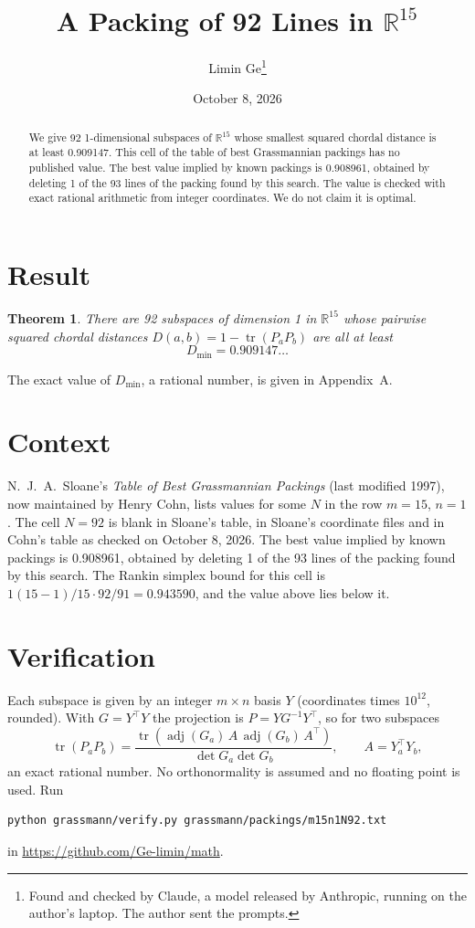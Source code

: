 \documentclass[11pt,a4paper]{article}
\title{A Packing of 92 Lines in $\mathbb{R}^{15}$}
\author{Limin Ge\thanks{Found and checked by Claude, a model released by Anthropic, running on the author's laptop. The author sent the prompts.}}
\date{October 8, 2026}
\newtheorem*{theorem}{Theorem}
\begin{document}
\maketitle
\begin{abstract}
We give 92 1-dimensional subspaces of $\mathbb{R}^{15}$ whose smallest squared chordal distance is at least 0.909147. This cell of the table of best Grassmannian packings has no published value. The best value implied by known packings is 0.908961, obtained by deleting 1 of the 93 lines of the packing found by this search. The value is checked with exact rational arithmetic from integer coordinates. We do not claim it is optimal.
\end{abstract}

\section{Result}
\begin{theorem}
There are 92 subspaces of dimension 1 in $\mathbb{R}^{15}$ whose pairwise squared chordal distances $D(a,b) = 1 - \operatorname{tr}(P_aP_b)$ are all at least
\[ D_{\min} = 0.909147\ldots \]
\end{theorem}
The exact value of $D_{\min}$, a rational number, is given in Appendix~A.


\section{Context}
N.~J.~A.~Sloane's \emph{Table of Best Grassmannian Packings} (last modified 1997), now maintained by Henry Cohn, lists values for some $N$ in the row $m=15$, $n=1$. The cell $N=92$ is blank in Sloane's table, in Sloane's coordinate files and in Cohn's table as checked on October 8, 2026. The best value implied by known packings is 0.908961, obtained by deleting 1 of the 93 lines of the packing found by this search. The Rankin simplex bound for this cell is $1(15-1)/15\cdot 92/91 = 0.943590$, and the value above lies below it.


\section{Verification}
Each subspace is given by an integer $m\times n$ basis $Y$ (coordinates times $10^{12}$, rounded). With $G=Y^\top Y$ the projection is $P=YG^{-1}Y^\top$, so for two subspaces
\[ \operatorname{tr}(P_aP_b)=\frac{\operatorname{tr}(\operatorname{adj}(G_a)\,A\,\operatorname{adj}(G_b)\,A^\top)}{\det G_a\det G_b},\qquad A=Y_a^\top Y_b, \]
an exact rational number. No orthonormality is assumed and no floating point is used. Run
\begin{verbatim}
python grassmann/verify.py grassmann/packings/m15n1N92.txt
\end{verbatim}
in \url{https://github.com/Ge-limin/math}.
\end{document}
